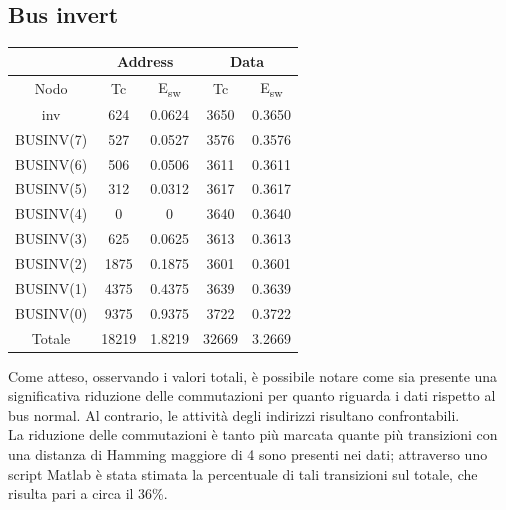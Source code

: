 \documentclass[11pt,  english, makeidx, a4paper, titlepage, oneside]{book}
\begin{document}
\subsection{Bus invert}
\begin{center}
	\begin{tabular}{|c|c|c||c|c|}
	\hline
	& \multicolumn{2}{c}{Address} & \multicolumn{2}{c}{Data}\\
	\hline
	Nodo & Tc & E\textsubscript{sw} & Tc & E\textsubscript{sw} \\
	\hline
	inv & 624 & 0.0624 & 3650 & 0.3650\\
	\hline
	BUSINV(7) & 527 & 0.0527 & 3576 & 0.3576\\
	 \hline
	BUSINV(6) & 506 & 0.0506 & 3611 & 0.3611\\
	\hline
	BUSINV(5) & 312 & 0.0312 & 3617 & 0.3617\\
	\hline
	BUSINV(4) & 0 & 0 & 3640 & 0.3640\\
	\hline
	BUSINV(3) & 625 & 0.0625 & 3613 & 0.3613\\
	\hline
	BUSINV(2) & 1875 & 0.1875 & 3601 & 0.3601\\
	\hline
	BUSINV(1) & 4375 & 0.4375 & 3639 & 0.3639\\
	\hline
	BUSINV(0) & 9375 & 0.9375 & 3722 & 0.3722\\
	\hline
	Totale & 18219 & 1.8219 & 32669 & 3.2669\\
	\hline
	\end{tabular}	
\end{center}
\vspace{0.3cm}
Come atteso, osservando i valori totali, è possibile notare come sia presente una significativa riduzione delle commutazioni per quanto riguarda i dati rispetto al bus normal. Al contrario, le attività degli indirizzi risultano confrontabili.
\\
La riduzione delle commutazioni è tanto più marcata quante più transizioni con una distanza di Hamming maggiore di 4 sono presenti nei dati; attraverso uno script Matlab è stata stimata la percentuale di tali transizioni sul totale, che risulta pari a circa il 36\%.
\end{document}
